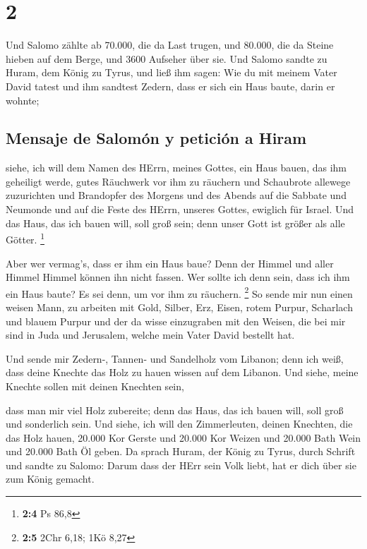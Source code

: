 \hypertarget{section-1}{%
\section{2}\label{section-1}}

 Und Salomo zählte ab 70.000, die da Last trugen, und
80.000, die da Steine hieben auf dem Berge, und 3600 Aufseher über sie.
 Und Salomo sandte zu Huram, dem König zu Tyrus, und ließ
ihm sagen: Wie du mit meinem Vater David tatest und ihm sandtest Zedern,
dass er sich ein Haus baute, darin er wohnte;

\hypertarget{mensaje-de-salomuxf3n-y-peticiuxf3n-a-hiram}{%
\subsection{Mensaje de Salomón y petición a
Hiram}\label{mensaje-de-salomuxf3n-y-peticiuxf3n-a-hiram}}

 siehe, ich will dem Namen des HErrn, meines Gottes, ein
Haus bauen, das ihm geheiligt werde, gutes Räuchwerk vor ihm zu räuchern
und Schaubrote allewege zuzurichten und Brandopfer des Morgens und des
Abends auf die Sabbate und Neumonde und auf die Feste des HErrn, unseres
Gottes, ewiglich für Israel.  Und das Haus, das ich bauen
will, soll groß sein; denn unser Gott ist größer als alle Götter.
\footnote{\textbf{2:4} Ps 86,8}

 Aber wer vermag's, dass er ihm ein Haus baue? Denn der
Himmel und aller Himmel Himmel können ihn nicht fassen. Wer sollte ich
denn sein, dass ich ihm ein Haus baute? Es sei denn, um vor ihm zu
räuchern. \footnote{\textbf{2:5} 2Chr 6,18; 1Kö 8,27}  So
sende mir nun einen weisen Mann, zu arbeiten mit Gold, Silber, Erz,
Eisen, rotem Purpur, Scharlach und blauem Purpur und der da wisse
einzugraben mit den Weisen, die bei mir sind in Juda und Jerusalem,
welche mein Vater David bestellt hat.

 Und sende mir Zedern-, Tannen- und Sandelholz vom
Libanon; denn ich weiß, dass deine Knechte das Holz zu hauen wissen auf
dem Libanon. Und siehe, meine Knechte sollen mit deinen Knechten sein,

 dass man mir viel Holz zubereite; denn das Haus, das ich
bauen will, soll groß und sonderlich sein.  Und siehe, ich
will den Zimmerleuten, deinen Knechten, die das Holz hauen, 20.000 Kor
Gerste und 20.000 Kor Weizen und 20.000 Bath Wein und 20.000 Bath Öl
geben.  Da sprach Huram, der König zu Tyrus, durch
Schrift und sandte zu Salomo: Darum dass der HErr sein Volk liebt, hat
er dich über sie zum König gemacht.

